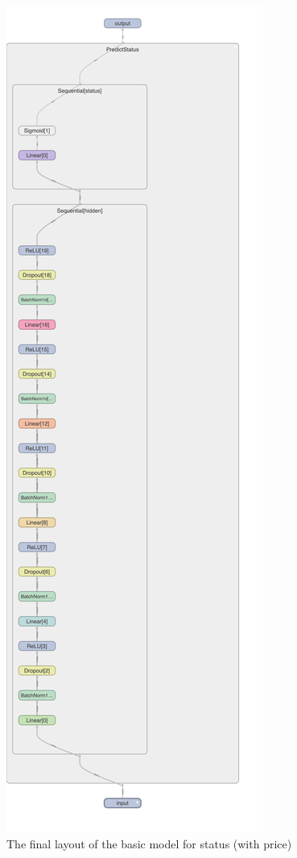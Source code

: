\documentclass[12pt,twoside]{report}
\begin{document}
\begin{figure}[H]
	\centering
	\includegraphics[height=\textheight]{basic_status_final_layout}
	\caption{The final layout of the basic model for status (with price)}
	\label{basic_status_final_layout}
\end{figure}
\end{document}
